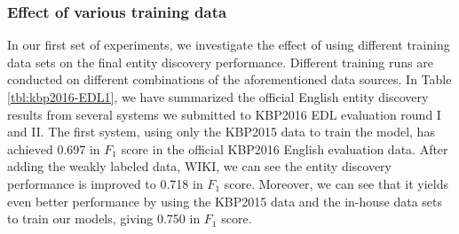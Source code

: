 \documentclass[11pt,a4paper]{article}
\begin{document}
	 




\subsubsection{Effect of various training data}

In our first set of experiments, we investigate the effect of using different training data sets on the final entity discovery performance. 
Different training runs are conducted on different combinations of the aforementioned data sources.
In Table \ref{tbl:kbp2016-EDL1}, we have summarized the official English entity discovery results from several systems we submitted to KBP2016 EDL evaluation round I and II. The first system, using only the KBP2015 data to train the model, has achieved 0.697 in $F_1$ score in the official KBP2016 English evaluation data. After adding the weakly labeled data, WIKI, we can see the entity discovery performance is improved to 0.718 in  $F_1$ score. Moreover, we can see that it yields even better performance by using the KBP2015 data and the in-house data sets to train our models, giving 0.750 in $F_1$ score. 
\end{document}
